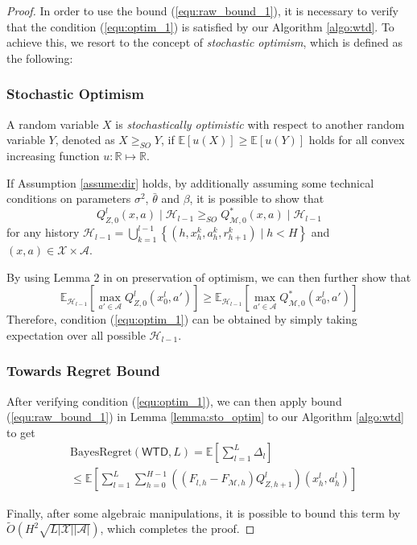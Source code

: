 \documentclass[letterpaper]{article} %
\newcommand{\Sp}[1]{\left(#1\right)}
\newcommand{\Mp}[1]{\left[#1\right]}
\newcommand{\Bp}[1]{\left\{#1\right\}}
\newcommand{\abs}[1]{\left|#1\right|}
\newcommand{\E}{\mathbb{E}}
\newcommand{\R}{\mathbb{R}}
\newcommand{\M}{\mathcal{M}}
\newcommand{\aX}{\abs{\mathcal{X}}}
\newcommand{\aA}{\abs{\mathcal{A}}}
\theoremstyle{definition}
\begin{document}
\begin{proof}
In order to use the bound (\ref{equ:raw_bound_1}), it is necessary to verify that the condition (\ref{equ:optim_1}) is satisfied by our Algorithm \ref{algo:wtd}. To achieve this, we resort to the concept of \textit{stochastic optimism}, which is defined as the following:
\subsubsection{Stochastic Optimism}
A random variable $X$ is \textit{stochastically optimistic} with respect to another random variable $Y$, denoted as $X\geq_{SO}Y$, if $\E\Mp{u\Sp{X}}\geq\E\Mp{u\Sp{Y}}$ holds for all convex increasing function $u:\R\mapsto\R$.

If Assumption \ref{assume:dir} holds, by additionally assuming some technical conditions on parameters $\sigma^2$, $\bar{\theta}$ and $\beta$, it is possible to show that
$$Q^l_{Z, 0}\Sp{x, a}\mid\mathcal{H}_{l-1}\geq_{SO}Q^*_{\M, 0}\Sp{x, a}\mid\mathcal{H}_{l-1}$$
for any history $\mathcal{H}_{l-1}=\bigcup_{k=1}^{l-1}\Bp{\Sp{h, x_h^k, a_h^k, r_{h+1}^k}\mid h<H}$ and $\Sp{x,a}\in\mathcal{X}\times\mathcal{A}$.

By using Lemma 2 in \cite{osband2017deep} on preservation of optimism, we can then further show that
\fontsize{9}{9}
$$\E_{\mathcal{H}_{l-1}}\Mp{\max_{a'\in\mathcal{A}}Q^l_{Z, 0}\Sp{x^l_0, a'}}\geq\E_{\mathcal{H}_{l-1}}\Mp{\max_{a'\in\mathcal{A}}Q^*_{\M, 0}\Sp{x^l_0, a'}}$$
\normalsize
Therefore, condition (\ref{equ:optim_1}) can be obtained by simply taking expectation over all possible $\mathcal{H}_{l-1}$.

\subsubsection{Towards Regret Bound}
After verifying condition (\ref{equ:optim_1}), we can then apply bound (\ref{equ:raw_bound_1}) in Lemma \ref{lemma:sto_optim} to our Algorithm \ref{algo:wtd} to get
\begin{align*}
&\mathrm{BayesRegret}\Sp{\mathsf{WTD}, L}=\E\Mp{\sum_{l=1}^{L}\Delta_l}\\
&\leq\E\Mp{\sum_{l=1}^{L}\sum_{h=0}^{H-1}\Sp{\Sp{F_{l, h}-F_{\M, h}}Q^l_{Z, h+1}}\Sp{x_h^l, a_h^l}}
\end{align*}

Finally, after some algebraic manipulations, it is possible to bound this term by $\widetilde{O}\Sp{H^2\sqrt{L\aX\aA}}$, which completes the proof.
\end{proof}
\end{document}
